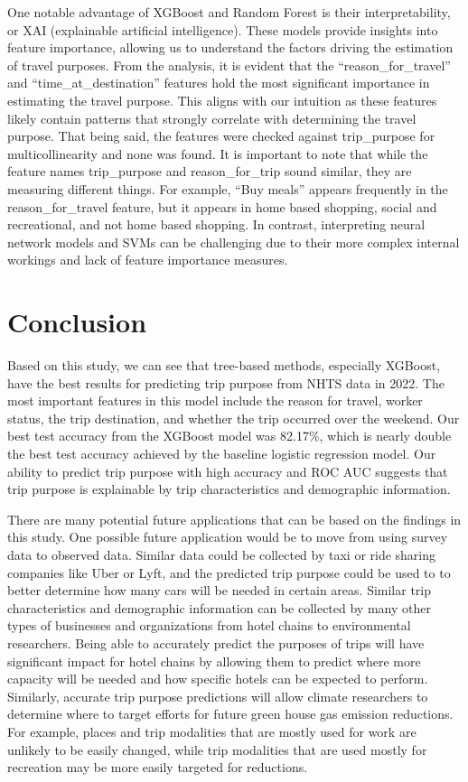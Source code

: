 \documentclass[
  article,
  nofooter]{jss}
\begin{document}
One notable advantage of XGBoost and Random Forest is their
interpretability, or XAI (explainable artificial intelligence). These
models provide insights into feature importance, allowing us to
understand the factors driving the estimation of travel purposes. From
the analysis, it is evident that the ``reason\_for\_travel'' and
``time\_at\_destination'' features hold the most significant importance
in estimating the travel purpose. This aligns with our intuition as
these features likely contain patterns that strongly correlate with
determining the travel purpose. That being said, the features were
checked against trip\_purpose for multicollinearity and none was found.
It is important to note that while the feature names trip\_purpose and
reason\_for\_trip sound similar, they are measuring different things.
For example, ``Buy meals'' appears frequently in the reason\_for\_travel
feature, but it appears in home based shopping, social and recreational,
and not home based shopping. In contrast, interpreting neural network
models and SVMs can be challenging due to their more complex internal
workings and lack of feature importance measures.

\section{Conclusion}\label{conclusion}

Based on this study, we can see that tree-based methods, especially
XGBoost, have the best results for predicting trip purpose from NHTS
data in 2022. The most important features in this model include the
reason for travel, worker status, the trip destination, and whether the
trip occurred over the weekend. Our best test accuracy from the XGBoost
model was 82.17\%, which is nearly double the best test accuracy
achieved by the baseline logistic regression model. Our ability to
predict trip purpose with high accuracy and ROC AUC suggests that trip
purpose is explainable by trip characteristics and demographic
information.

There are many potential future applications that can be based on the
findings in this study. One possible future application would be to move
from using survey data to observed data. Similar data could be collected
by taxi or ride sharing companies like Uber or Lyft, and the predicted
trip purpose could be used to to better determine how many cars will be
needed in certain areas. Similar trip characteristics and demographic
information can be collected by many other types of businesses and
organizations from hotel chains to environmental researchers. Being able
to accurately predict the purposes of trips will have significant impact
for hotel chains by allowing them to predict where more capacity will be
needed and how specific hotels can be expected to perform. Similarly,
accurate trip purpose predictions will allow climate researchers to
determine where to target efforts for future green house gas emission
reductions. For example, places and trip modalities that are mostly used
for work are unlikely to be easily changed, while trip modalities that
are used mostly for recreation may be more easily targeted for
reductions.
\end{document}
